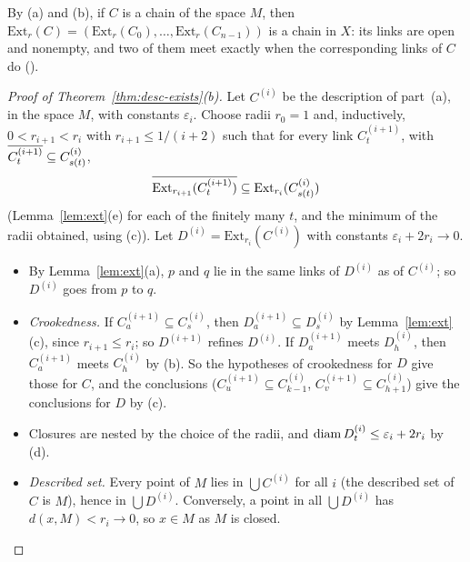 
By (a) and (b), if $C$ is a chain of the space $M$, then $\mathrm{Ext}_r(C)=(\mathrm{Ext}_r(C_0),\dots,\mathrm{Ext}_r(C_{n-1}))$ is a chain in $X$:
its links are open and nonempty, and two of them meet exactly when the corresponding links of $C$ do
().

\begin{proof}[Proof of Theorem~\ref{thm:desc-exists}(b)]
Let $C^{(i)}$ be the description of part~(a), in the space $M$, with constants $\varepsilon_i$. Choose radii $r_0=1$ and, inductively,
$0<r_{i+1}<r_i$ with $r_{i+1}\le1/(i+2)$ such that for every link $C^{(i+1)}_t$, with $\overline{C^{(i+1)}_t}\subseteq C^{(i)}_{s(t)}$,
\[
\overline{\mathrm{Ext}_{r_{i+1}}(C^{(i+1)}_t)}\subseteq\mathrm{Ext}_{r_i}(C^{(i)}_{s(t)})
\]
(Lemma~\ref{lem:ext}(e) for each of the finitely many $t$, and the minimum of the radii obtained, using (c)). Let $D^{(i)}=\mathrm{Ext}_{r_i}(C^{(i)})$
with constants $\varepsilon_i+2r_i\to0$.
\begin{itemize}
\item By Lemma~\ref{lem:ext}(a), $p$ and $q$ lie in the same links of $D^{(i)}$ as of $C^{(i)}$; so $D^{(i)}$ goes from $p$ to $q$.
\item \emph{Crookedness.} If $C^{(i+1)}_a\subseteq C^{(i)}_s$, then $D^{(i+1)}_a\subseteq D^{(i)}_s$ by Lemma~\ref{lem:ext}(c), since $r_{i+1}\le r_i$; so
$D^{(i+1)}$ refines $D^{(i)}$. If $D^{(i+1)}_a$ meets $D^{(i)}_h$, then $C^{(i+1)}_a$ meets $C^{(i)}_h$ by (b). So the hypotheses of crookedness
for $D$ give those for $C$, and the conclusions ($C^{(i+1)}_u\subseteq C^{(i)}_{k-1}$, $C^{(i+1)}_v\subseteq C^{(i)}_{h+1}$) give the conclusions
for $D$ by (c).
\item Closures are nested by the choice of the radii, and $\operatorname{diam} D^{(i)}_t\le\varepsilon_i+2r_i$ by (d).
\item \emph{Described set.} Every point of $M$ lies in $\bigcup C^{(i)}$ for all $i$ (the described set of $C$ is $M$), hence in $\bigcup
D^{(i)}$. Conversely, a point in all $\bigcup D^{(i)}$ has $d(x,M)<r_i\to0$, so $x\in M$ as $M$ is closed.\qedhere
\end{itemize}
\end{proof}


